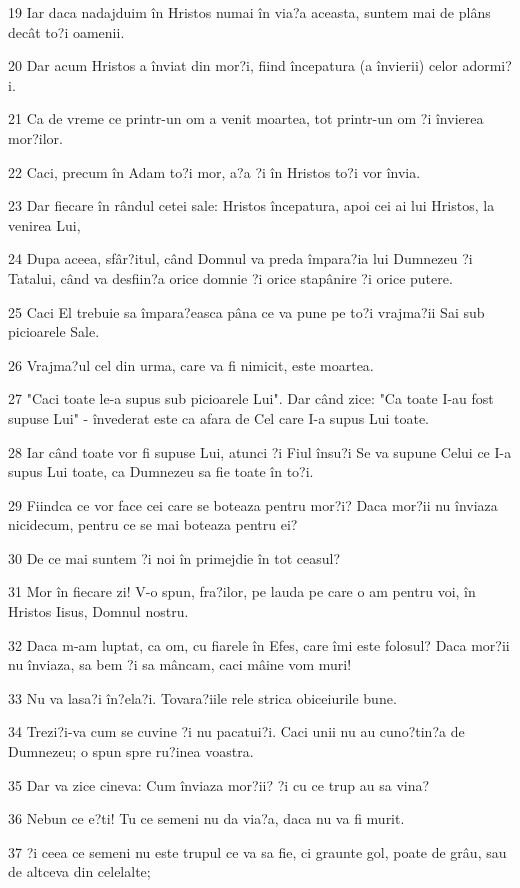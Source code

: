 \par 19 Iar daca nadajduim în Hristos numai în via?a aceasta, suntem mai de plâns decât to?i oamenii.
\par 20 Dar acum Hristos a înviat din mor?i, fiind începatura (a învierii) celor adormi?i.
\par 21 Ca de vreme ce printr-un om a venit moartea, tot printr-un om ?i învierea mor?ilor.
\par 22 Caci, precum în Adam to?i mor, a?a ?i în Hristos to?i vor învia.
\par 23 Dar fiecare în rândul cetei sale: Hristos începatura, apoi cei ai lui Hristos, la venirea Lui,
\par 24 Dupa aceea, sfâr?itul, când Domnul va preda împara?ia lui Dumnezeu ?i Tatalui, când va desfiin?a orice domnie ?i orice stapânire ?i orice putere.
\par 25 Caci El trebuie sa împara?easca pâna ce va pune pe to?i vrajma?ii Sai sub picioarele Sale.
\par 26 Vrajma?ul cel din urma, care va fi nimicit, este moartea.
\par 27 "Caci toate le-a supus sub picioarele Lui". Dar când zice: "Ca toate I-au fost supuse Lui" - învederat este ca afara de Cel care I-a supus Lui toate.
\par 28 Iar când toate vor fi supuse Lui, atunci ?i Fiul însu?i Se va supune Celui ce I-a supus Lui toate, ca Dumnezeu sa fie toate în to?i.
\par 29 Fiindca ce vor face cei care se boteaza pentru mor?i? Daca mor?ii nu înviaza nicidecum, pentru ce se mai boteaza pentru ei?
\par 30 De ce mai suntem ?i noi în primejdie în tot ceasul?
\par 31 Mor în fiecare zi! V-o spun, fra?ilor, pe lauda pe care o am pentru voi, în Hristos Iisus, Domnul nostru.
\par 32 Daca m-am luptat, ca om, cu fiarele în Efes, care îmi este folosul? Daca mor?ii nu înviaza, sa bem ?i sa mâncam, caci mâine vom muri!
\par 33 Nu va lasa?i în?ela?i. Tovara?iile rele strica obiceiurile bune.
\par 34 Trezi?i-va cum se cuvine ?i nu pacatui?i. Caci unii nu au cuno?tin?a de Dumnezeu; o spun spre ru?inea voastra.
\par 35 Dar va zice cineva: Cum înviaza mor?ii? ?i cu ce trup au sa vina?
\par 36 Nebun ce e?ti! Tu ce semeni nu da via?a, daca nu va fi murit.
\par 37 ?i ceea ce semeni nu este trupul ce va sa fie, ci graunte gol, poate de grâu, sau de altceva din celelalte;
